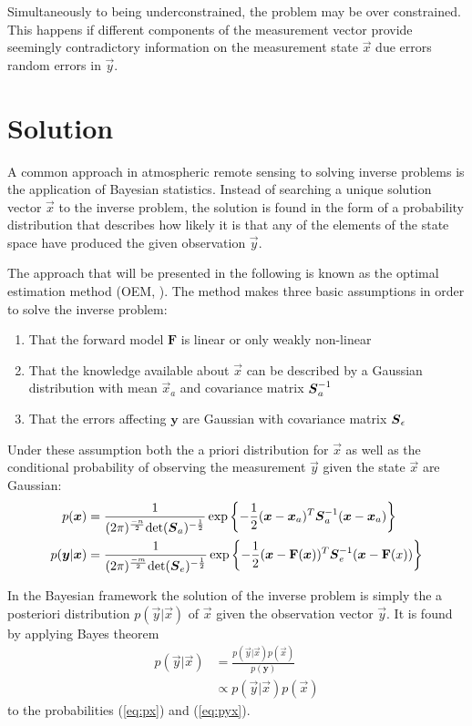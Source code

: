 Simultaneously to being underconstrained, the problem may be over constrained.
This happens if different components of the measurement vector provide seemingly
contradictory information on the measurement state $\vec{x}$ due errors random
errors in $\vec{y}$.

\section{Solution}

A common approach in atmospheric remote sensing to solving inverse problems
is the application of Bayesian statistics. Instead of searching a unique solution
vector $\vec{x}$ to the inverse problem, the solution is found in the form of a
probability distribution that describes how likely it is that any of the elements
of the state space have produced the given observation $\vec{y}$.

The approach that will be presented in the following is known as the optimal estimation
method (OEM, \textcite{rodgers00}). The method makes three basic assumptions in order
to solve the inverse problem:
\begin{enumerate}
\item That the forward model $\mathbf{F}$ is linear or only weakly non-linear
\item That the knowledge available about $\vec{x}$ can be described by a Gaussian distribution
  with mean $\vec{x}_a$ and covariance matrix $\boldsymbol{S}_a^{-1}$
\item That the errors affecting $\mathbf{y}$ are Gaussian with covariance matrix $\boldsymbol{S}_\epsilon$
\end{enumerate}

Under these assumption both the a priori distribution for  $\vec{x}$ as well as the conditional
probability of observing the measurement $\vec{y}$ given the state $\vec{x}$ are Gaussian:
\begin{align}
p(\boldsymbol{x}) &= \frac{1}{(2 \pi)^{\frac{-n}{2}} \text{det}(\boldsymbol{S}_a)^{-\frac{1}{2}}} \exp \left \{ -\frac{1}{2}(\boldsymbol{x} - \boldsymbol{x}_a)^T\boldsymbol{S}_a^{-1}(\boldsymbol{x} - \boldsymbol{x}_a ) \right \}\label{eq:px}\\
p(\boldsymbol{y} | \boldsymbol{x}) &= \frac{1}{(2 \pi)^{\frac{-m}{2}} \text{det}(\boldsymbol{S}_e)^{-\frac{1}{2}}} \exp \left \{-\frac{1}{2}(\boldsymbol{x} - \mathbf{F}(\boldsymbol{x}))^T\boldsymbol{S}_e^{-1}(\boldsymbol{x} - \mathbf{F}(x)) \right \}\label{eq:pyx}
\end{align}

In the Bayesian framework the solution of the inverse problem is simply the a posteriori distribution
$p(\vec{y} | \vec{x})$ of $\vec{x}$ given the observation vector $\vec{y}$. It is found by applying
Bayes theorem
\begin{align}
  p(\vec{y} | \vec{x}) &= \frac{p(\vec{y} | \vec{x})p(\vec{x})}{p(\mathbf{y})} \\
  &\propto  p(\vec{y} | \vec{x})p(\vec{x})
\end{align}
to the probabilities  (\ref{eq:px}) and (\ref{eq:pyx}).

